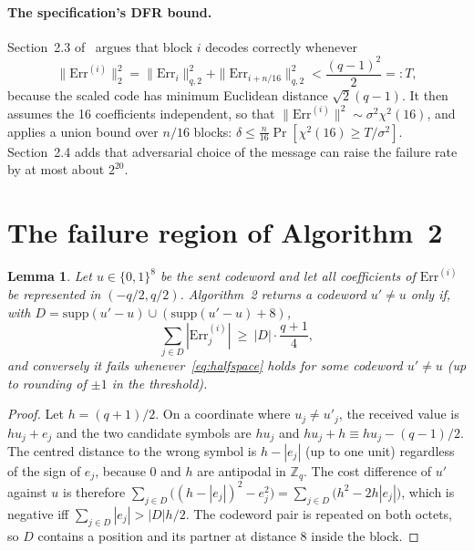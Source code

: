 \documentclass[11pt,a4paper]{article}
\newtheorem{lemma}{Lemma}
\theoremstyle{definition}
\theoremstyle{remark}
\newcommand{\Err}{\mathrm{Err}}
\newcommand{\Z}{\mathbb{Z}}
\newcommand{\dfr}{\delta}
\begin{document}
\paragraph{The specification's DFR bound.}
Section~2.3 of~\cite{DTRU} argues that block $i$ decodes correctly whenever
\begin{equation}
\label{eq:ball}
\|\Err^{(i)}\|_2^2=\|\Err_i\|_{q,2}^2+\|\Err_{i+n/16}\|_{q,2}^2<\frac{(q-1)^2}{2}=:T,
\end{equation}
because the scaled code has minimum Euclidean distance $\sqrt2(q-1)$. It
then assumes the 16 coefficients independent, so that
$\|\Err^{(i)}\|^2\sim\sigma^2\chi^2(16)$, and applies a union bound over
$n/16$ blocks:
$\dfr\le\frac{n}{16}\Pr[\chi^2(16)\ge T/\sigma^2]$. Section~2.4 adds that
adversarial choice of the message can raise the failure rate by at most
about $2^{20}$.

\section{The failure region of Algorithm~2}
\label{sec:region}

\begin{lemma}
\label{lem:region}
Let $u\in\{0,1\}^8$ be the sent codeword and let all coefficients of
$\Err^{(i)}$ be represented in $(-q/2,q/2)$. Algorithm~2 returns a codeword
$u'\ne u$ only if, with $D=\mathrm{supp}(u'-u)\cup(\mathrm{supp}(u'-u)+8)$,
\begin{equation}
\label{eq:halfspace}
\sum_{j\in D}|\Err^{(i)}_j|\ \ge\ |D|\cdot\frac{q+1}{4},
\end{equation}
and conversely it fails whenever~\eqref{eq:halfspace} holds for some
codeword $u'\ne u$ (up to rounding of $\pm1$ in the threshold).
\end{lemma}

\begin{proof}
Let $h=(q+1)/2$. On a coordinate where $u_j\ne u'_j$, the received value is
$hu_j+e_j$ and the two candidate symbols are $hu_j$ and $hu_j+h\equiv
hu_j-(q-1)/2$. The centred distance to the wrong symbol is $h-|e_j|$ (up to
one unit) regardless of the sign of $e_j$, because $0$ and $h$ are
antipodal in $\Z_q$. The cost difference of $u'$ against $u$ is therefore
$\sum_{j\in D}\bigl((h-|e_j|)^2-e_j^2\bigr)=\sum_{j\in D}\bigl(h^2-2h|e_j|\bigr)$,
which is negative iff $\sum_{j\in D}|e_j|>|D|h/2$. The codeword pair is
repeated on both octets, so $D$ contains a position and its partner at
distance 8 inside the block.
\end{proof}
\end{document}
